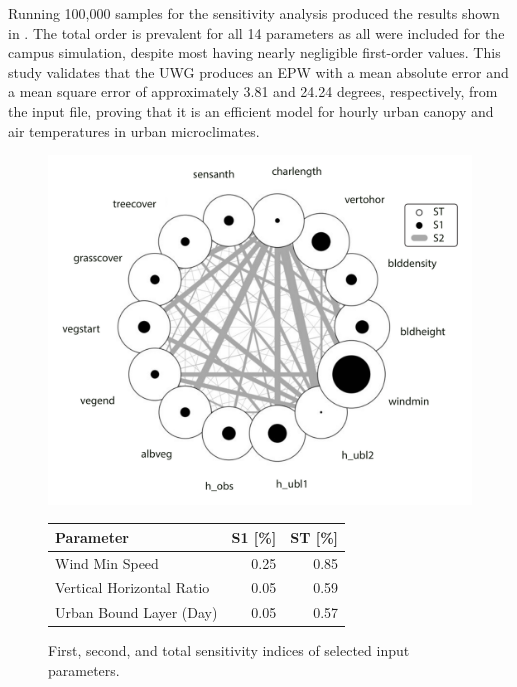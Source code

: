 \documentclass[a4paper, 12pt]{article}
\begin{document}
Running 100,000 samples for the sensitivity analysis produced the results shown in . 
The total order is prevalent for all 14 parameters as all were included for the campus simulation, despite most having nearly negligible first-order values. 
This study validates that the UWG produces an EPW with a mean absolute error and a mean square error of approximately 3.81 and 24.24 degrees, respectively, from the input file, proving that it is an efficient model for hourly urban canopy and air temperatures in urban microclimates.

\begin{figure}[htb]
    \centering
    \begin{minipage}[b]{0.48\textwidth}
        \centering
        \includegraphics[width=\textwidth, trim = 0.5cm 0.5cm 0.5cm 0.5cm, clip = true]{Figures/UWG_Sensitivity.pdf}
        \caption{First, second, and total sensitivity indices of selected input parameters.}
        \label{fig:radial-plot}
    \end{minipage}
    \hfill
    \begin{minipage}[b]{0.48\textwidth}
        \centering
        \scriptsize
        \begin{tabular}{lrr}
        \toprule
        \textbf{Parameter} & \textbf{S1} [\%] & \textbf{ST} [\%] \\
        \midrule
        Wind Min Speed & 0.25 & 0.85 \\
        Vertical Horizontal Ratio & 0.05 & 0.59\\
        Urban Bound Layer (Day) & 0.05 & 0.57 \\

\end{tabular}
\end{minipage}
\end{figure}
\end{document}

